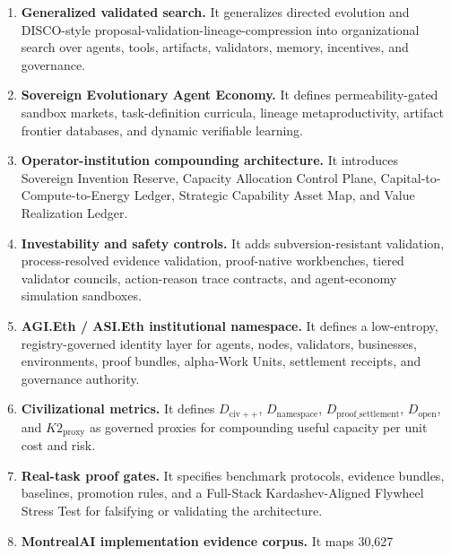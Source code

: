 \begin{enumerate}
  \textbf{Proof-gated AI-generating work engine.} It generalizes AI-GAs,
  OMNI-EPIC-style open-ended task generation, ADAS-style agent design,
  and Absolute Zero-style verifier-grounded self-play into a
  commercially independent layer that generates tasks, environments,
  agents, validators, proof templates, curricula, and capability
  packages under proof, replay, safety, settlement, AGI.Eth namespace
  authority, and civilizational value-to-energy constraints.
\item
  \textbf{Generalized validated search.} It generalizes directed
  evolution and DISCO-style proposal-validation-lineage-compression into
  organizational search over agents, tools, artifacts, validators,
  memory, incentives, and governance.
\item
  \textbf{Sovereign Evolutionary Agent Economy.} It defines
  permeability-gated sandbox markets, task-definition curricula, lineage
  metaproductivity, artifact frontier databases, and dynamic verifiable
  learning.
\item
  \textbf{Operator-institution compounding architecture.} It introduces
  Sovereign Invention Reserve, Capacity Allocation Control Plane,
  Capital-to-Compute-to-Energy Ledger, Strategic Capability Asset Map,
  and Value Realization Ledger.
\item
  \textbf{Investability and safety controls.} It adds
  subversion-resistant validation, process-resolved evidence validation,
  proof-native workbenches, tiered validator councils, action-reason
  trace contracts, and agent-economy simulation sandboxes.
\item
  \textbf{AGI.Eth / ASI.Eth institutional namespace.} It defines a
  low-entropy, registry-governed identity layer for agents, nodes,
  validators, businesses, environments, proof bundles, alpha-Work Units,
  settlement receipts, and governance authority.
\item
  \textbf{Civilizational metrics.} It defines \(D_{\mathrm{civ}++}\),
  \(D_{\mathrm{namespace}}\), \(D_{\mathrm{proof\_settlement}}\),
  \(D_{\mathrm{open}}\), and \(K2_{\mathrm{proxy}}\) as governed proxies
  for compounding useful capacity per unit cost and risk.
\item
  \textbf{Real-task proof gates.} It specifies benchmark protocols,
  evidence bundles, baselines, promotion rules, and a Full-Stack
  Kardashev-Aligned Flywheel Stress Test for falsifying or validating
  the architecture.
\item
  \textbf{MontrealAI implementation evidence corpus.} It maps 30,627

\end{enumerate}
